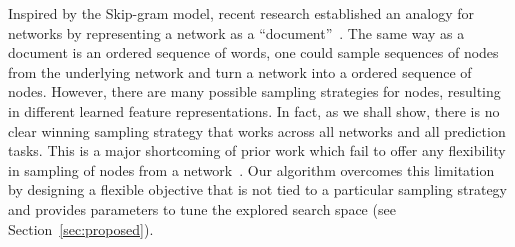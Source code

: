Inspired by the Skip-gram model, recent research established an analogy for networks by representing a network as a ``document''~\cite{deepwalk, line}.
The same way as a document is an ordered sequence of words, one could sample sequences of nodes from the underlying network and turn a network into a ordered sequence of nodes. However, there are many possible sampling strategies for nodes, resulting in different learned feature representations. In fact, as we shall show, there is no clear winning sampling strategy that works across all networks and all prediction tasks. This is a major shortcoming of prior work which fail to offer any flexibility in sampling of nodes from a network~\cite{deepwalk, line}. Our algorithm \nodevec overcomes this limitation by designing a flexible objective that is not tied to a particular sampling strategy and provides parameters to tune the explored search space (see Section~\ref{sec:proposed}).




